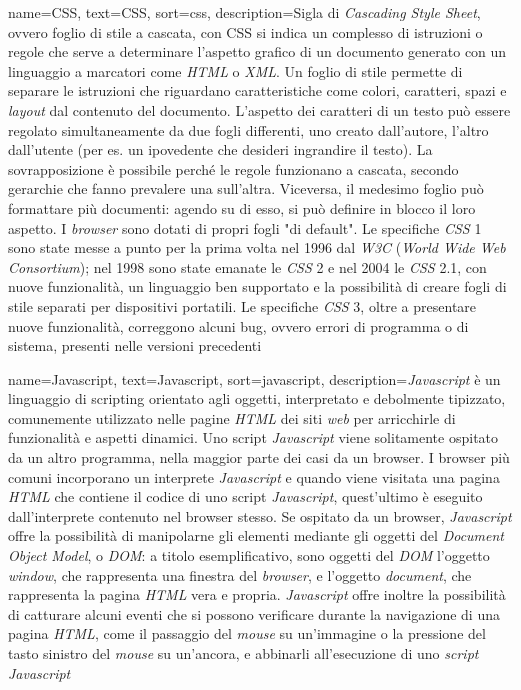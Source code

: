  {
    name=CSS,
    text=CSS,
    sort=css,
    description={Sigla di \emph{Cascading Style Sheet}, ovvero foglio di stile a cascata, con CSS si indica un complesso di istruzioni o regole che serve a determinare l’aspetto grafico di un documento generato con un linguaggio a marcatori come \emph{HTML} o \emph{XML}. 
    Un foglio di stile permette di separare le istruzioni che riguardano caratteristiche come colori, caratteri, spazi e \emph{layout} dal contenuto del documento. 
    L’aspetto dei caratteri di un testo può essere regolato simultaneamente da due fogli differenti, uno creato dall’autore, l’altro dall’utente (per es. un ipovedente che desideri ingrandire il testo). 
    La sovrapposizione è possibile perché le regole funzionano a cascata, secondo gerarchie che fanno prevalere una sull’altra. 
    Viceversa, il medesimo foglio può formattare più documenti: agendo su di esso, si può definire in blocco il loro aspetto. 
    I \emph{browser} sono dotati di propri fogli "di default". 
    Le specifiche \emph{CSS} 1 sono state messe a punto per la prima volta nel 1996 dal \emph{W3C} (\emph{World Wide Web Consortium}); nel 1998 sono state emanate le \emph{CSS} 2 e nel 2004 le \emph{CSS} 2.1, con nuove funzionalità, un linguaggio ben supportato e la possibilità di creare fogli di stile separati per dispositivi portatili. 
    Le specifiche \emph{CSS} 3, oltre a presentare nuove funzionalità, correggono alcuni bug, ovvero errori di programma o di sistema, presenti nelle versioni precedenti}
}

 {
    name=Javascript,
    text=Javascript,
    sort=javascript,
    description={\emph{Javascript} è un linguaggio di scripting orientato agli oggetti, interpretato e debolmente tipizzato, comunemente utilizzato nelle pagine \emph{HTML} dei siti \emph{web} per arricchirle di funzionalità e aspetti dinamici. 
    Uno script \emph{Javascript} viene solitamente ospitato da un altro programma, nella maggior parte dei casi da un browser. 
    I browser più comuni incorporano un interprete \emph{Javascript} e quando viene visitata una pagina \emph{HTML} che contiene il codice di uno script \emph{Javascript}, quest'ultimo è eseguito dall’interprete contenuto nel browser stesso.  
    Se ospitato da un browser, \emph{Javascript} offre la possibilità di manipolarne gli elementi mediante gli oggetti del \emph{Document Object Model}, o \emph{DOM}: a titolo esemplificativo, sono oggetti del \emph{DOM} l’oggetto \emph{window}, che rappresenta una finestra del \emph{browser}, e l’oggetto \emph{document}, che rappresenta la pagina \emph{HTML} vera e propria. 
    \emph{Javascript} offre inoltre la possibilità di catturare alcuni eventi che si possono verificare durante la navigazione di una pagina \emph{HTML}, come il passaggio del \emph{mouse} su un’immagine o la pressione del tasto sinistro del \emph{mouse} su un’ancora, e abbinarli all’esecuzione di uno \emph{script Javascript}}
}